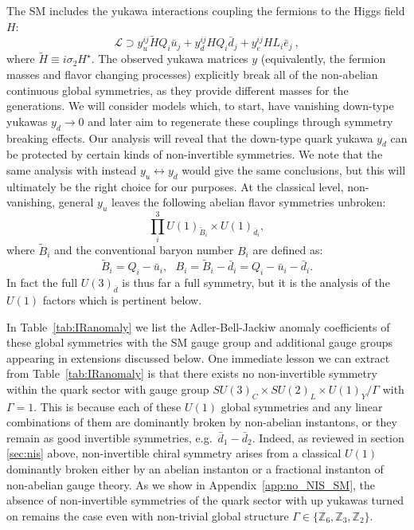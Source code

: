 \documentclass[11pt,a4paper]{article}
\begin{document}
The SM includes the yukawa interactions coupling the fermions to the Higgs field $H$:
\begin{equation}\label{eqn:SMyuk}
    \mathcal{L} \supset y_u^{ij} \tilde{H} Q_i \bar u_j + y_d^{ij} H Q_i \bar d_j + y_e^{ij} H L_i \bar e_j~,
\end{equation}
where $\tilde{H} \equiv i \sigma_2 H^\star$.  The observed yukawa matrices $y$ (equivalently, the fermion masses and flavor changing processes) explicitly break all of the non-abelian continuous global symmetries, as they provide different masses for the generations. We will consider models which, to start, have vanishing down-type yukawas $y_{d}\rightarrow 0$ and later aim to regenerate these couplings through symmetry breaking effects.  Our  analysis will reveal that the down-type quark yukawa $y_d$ can be protected by certain kinds of non-invertible symmetries. We note that the same analysis with instead $y_u \leftrightarrow y_d$ would give the same conclusions, but this will ultimately be the right choice for our purposes. At the classical level, non-vanishing, general $y_u$ leaves the following abelian flavor symmetries unbroken: 
\begin{equation}
   \prod_i^3 U(1)_{\tilde{B}_i} \times U(1)_{\bar d_i}, 
   \label{eq:classical_symm}
\end{equation}
where $\tilde{B}_i$ and the conventional baryon number $B_i$  are defined as:
\begin{equation}
    \tilde{B}_i = Q_i - \bar{u}_i, ~~~B_i=\tilde{B}_i - \bar{d}_i=Q_i - \bar{u}_i-\bar{d}_{i}.
\end{equation}
In fact the full $U(3)_{\bar d}$ is thus far a full symmetry, but it is the analysis of the $U(1)$ factors which is pertinent below.

In Table~\ref{tab:IRanomaly} we list the Adler-Bell-Jackiw \cite{Adler:1969gk,Bell:1969ts} anomaly coefficients of these global symmetries with the SM gauge group and additional gauge groups appearing in extensions discussed below. 
One immediate lesson we can extract from Table~\ref{tab:IRanomaly} is that there exists no non-invertible symmetry within the quark sector with gauge group $SU(3)_C \times SU(2)_L \times U(1)_Y / \Gamma$ with $\Gamma = 1$. This is because each of these $U(1)$ global symmetries and any linear combinations of them are dominantly broken by non-abelian instantons, or they remain as good invertible symmetries, e.g.~$\bar d_1 - \bar d_2$. Indeed, as reviewed in section \ref{sec:nis} above, non-invertible chiral symmetry arises from a classical $U(1)$ dominantly broken either by an abelian instanton or a fractional instanton of non-abelian gauge theory. As we show in Appendix~\ref{app:no_NIS_SM}, the absence of non-invertible symmetries of the quark sector with up yukawas turned on remains the case even with non-trivial global structure $\Gamma \in \lbrace \mathbb{Z}_6, \mathbb{Z}_3, \mathbb{Z}_2\rbrace$. 
\end{document}
